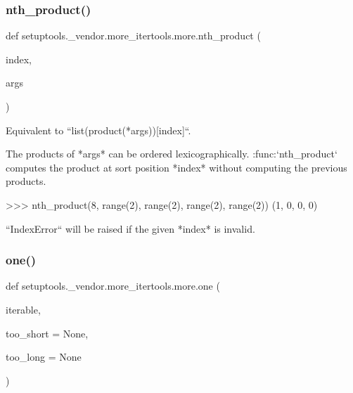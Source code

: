 \subsubsection{\texorpdfstring{nth\+\_\+product()}{nth\_product()}}
{\footnotesize\ttfamily def setuptools.\+\_\+vendor.\+more\+\_\+itertools.\+more.\+nth\+\_\+product (\begin{DoxyParamCaption}\item[{}]{index,  }\item[{}]{args }\end{DoxyParamCaption})}

\begin{DoxyVerb}Equivalent to ``list(product(*args))[index]``.

The products of *args* can be ordered lexicographically.
:func:`nth_product` computes the product at sort position *index* without
computing the previous products.

    >>> nth_product(8, range(2), range(2), range(2), range(2))
    (1, 0, 0, 0)

``IndexError`` will be raised if the given *index* is invalid.
\end{DoxyVerb}
 \mbox{\label{namespacesetuptools_1_1__vendor_1_1more__itertools_1_1more_a86598b2a838b7562a0cc40e362020a28}} 
\subsubsection{\texorpdfstring{one()}{one()}}
{\footnotesize\ttfamily def setuptools.\+\_\+vendor.\+more\+\_\+itertools.\+more.\+one (\begin{DoxyParamCaption}\item[{}]{iterable,  }\item[{}]{too\+\_\+short = {\ttfamily None},  }\item[{}]{too\+\_\+long = {\ttfamily None} }\end{DoxyParamCaption})}

